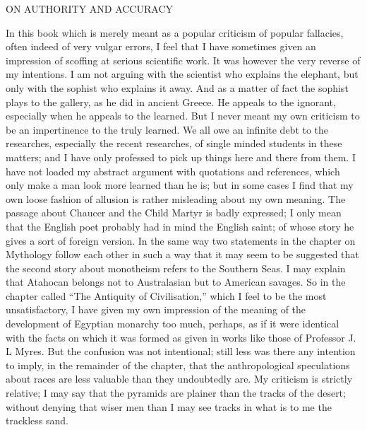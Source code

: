 
ON AUTHORITY AND ACCURACY

In this book which is merely meant as a popular criticism of popular fallacies, often indeed of very vulgar errors, I feel that I have sometimes given an impression of scoffing at serious scientific work. It was however the very reverse of my intentions. I am not arguing with the scientist who explains the elephant, but only with the sophist who explains it away. And as a matter of fact the sophist plays to the gallery, as he did in ancient Greece. He appeals to the ignorant, especially when he appeals to the learned. But I never meant my own criticism to be an impertinence to the truly learned. We all owe an infinite debt to the researches, especially the recent researches, of single minded students in these matters; and I have only professed to pick up things here and there from them. I have not loaded my abstract argument with quotations and references, which only make a man look more learned than he is; but in some cases I find that my own loose fashion of allusion is rather misleading about my own meaning. The passage about Chaucer and the Child Martyr is badly expressed; I only mean that the English poet probably had in mind the English saint; of whose story he gives a sort of foreign version. In the same way two statements in the chapter on Mythology follow each other in such a way that it may seem to be suggested that the second story about monotheism refers to the Southern Seas. I may explain that Atahocan belongs not to Australasian but to American savages. So in the chapter called ``The Antiquity of Civilisation,'' which I feel to be the most unsatisfactory, I have given my own impression of the meaning of the development of Egyptian monarchy too much, perhaps, as if it were identical with the facts on which it was formed as given in works like those of Professor J. L Myres. But the confusion was not intentional; still less was there any intention to imply, in the remainder of the chapter, that the anthropological speculations about races are less valuable than they undoubtedly are. My criticism is strictly relative; I may say that the pyramids are plainer than the tracks of the desert; without denying that wiser men than I may see tracks in what is to me the trackless sand.
